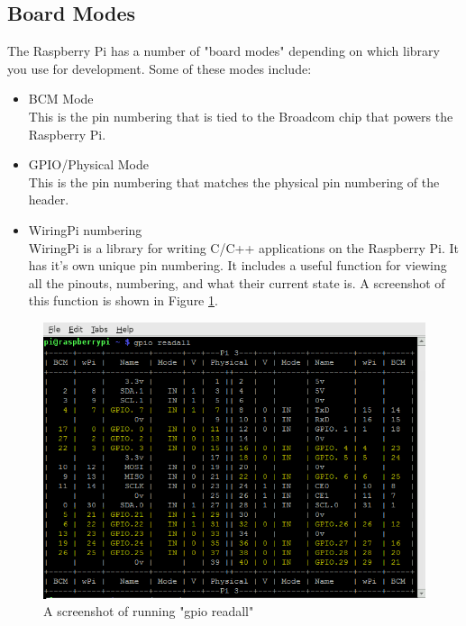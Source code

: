 \subsection{Board Modes}
\label{sec:BoardModes}
The Raspberry Pi has a number of "board modes" depending on which library you use for development. Some of these modes include:
\begin{itemize}
    \item BCM Mode\\
    This is the pin numbering that is tied to the Broadcom chip that powers the Raspberry Pi.
    \item GPIO/Physical Mode\\
    This is the pin numbering that matches the physical pin numbering of the header.
    \item WiringPi numbering\\
    WiringPi is a library for writing C/C++ applications on the Raspberry Pi. It has it's own unique pin numbering. It includes a useful function for viewing all the pinouts, numbering, and what their current state is. A screenshot of this function is shown in Figure \ref{fig:gpio-readall}.
\end{itemize}

\begin{figure}[H]
\centering
\includegraphics[width=0.6\columnwidth]{Figures/gpio-readall}
\caption{A screenshot of running "gpio readall"}
\label{fig:gpio-readall}
\end{figure}

